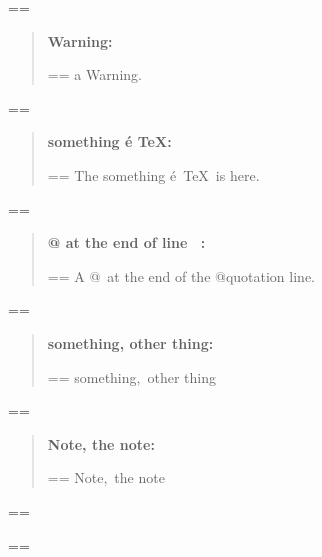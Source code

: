 \documentclass{book}
\makeatletter
\newenvironment{Texinfopreformatted}{%
  \par\GNUTobeylines\obeyspaces\frenchspacing\parskip=\z@\parindent=\z@}{}
{\catcode`\^^M=13 \gdef\GNUTobeylines{\catcode`\^^M=13 \def^^M{\null\par}}}
\newenvironment{Texinfoindented}{\begin{list}{}{}\item\relax}{\end{list}}
\renewcommand{\_}{\Texinfounderscore\discretionary{}{}{}}
\makeatother
\begin{document}
\begin{Texinfoindented}
\begin{Texinfopreformatted}
\ttfamily 
\end{Texinfopreformatted}
\begin{quote}
\textbf{Warning:} \begin{Texinfopreformatted}%
\ttfamily a Warning.
\end{Texinfopreformatted}
\end{quote}
\begin{Texinfopreformatted}%
\ttfamily 
\end{Texinfopreformatted}
\begin{quote}
\textbf{something \'{e} \TeX{}:} \begin{Texinfopreformatted}%
\ttfamily The something \'{e}\ \TeX{}\ is here.
\end{Texinfopreformatted}
\end{quote}
\begin{Texinfopreformatted}%
\ttfamily 
\end{Texinfopreformatted}
\begin{quote}
\textbf{@ at the end of line \ {}:} \begin{Texinfopreformatted}%
\ttfamily A @\ at the end of the @quotation line.
\end{Texinfopreformatted}
\end{quote}
\begin{Texinfopreformatted}%
\ttfamily 
\end{Texinfopreformatted}
\begin{quote}
\textbf{something, other thing:} \begin{Texinfopreformatted}%
\ttfamily something,\ other thing
\end{Texinfopreformatted}
\end{quote}
\begin{Texinfopreformatted}%
\ttfamily 
\end{Texinfopreformatted}
\begin{quote}
\textbf{Note, the note:} \begin{Texinfopreformatted}%
\ttfamily Note,\ the note
\end{Texinfopreformatted}
\end{quote}
\begin{Texinfopreformatted}%
\ttfamily 
\end{Texinfopreformatted}
\begin{quote}
\end{quote}
\begin{Texinfopreformatted}%
\ttfamily 
\end{Texinfopreformatted}
\begin{quote}

\end{quote}
\end{Texinfoindented}
\end{document}
